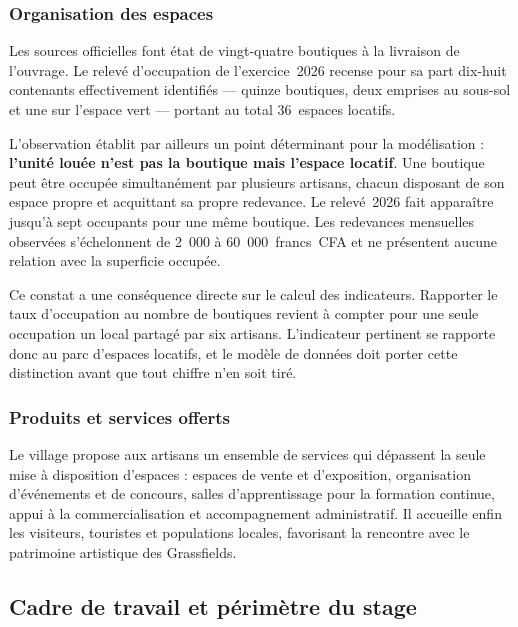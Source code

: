 \subsubsection{Organisation des espaces}

Les sources officielles font état de vingt-quatre boutiques à la livraison de l'ouvrage. Le relevé d'occupation de l'exercice~2026 recense pour sa part dix-huit contenants effectivement identifiés --- quinze boutiques, deux emprises au sous-sol et une sur l'espace vert --- portant au total 36~espaces locatifs.

L'observation établit par ailleurs un point déterminant pour la modélisation : \textbf{l'unité louée n'est pas la boutique mais l'espace locatif}. Une boutique peut être occupée simultanément par plusieurs artisans, chacun disposant de son espace propre et acquittant sa propre redevance. Le relevé~2026 fait apparaître jusqu'à sept occupants pour une même boutique. Les redevances mensuelles observées s'échelonnent de 2~000 à 60~000~francs~CFA et ne présentent aucune relation avec la superficie occupée.

Ce constat a une conséquence directe sur le calcul des indicateurs. Rapporter le taux d'occupation au nombre de boutiques revient à compter pour une seule occupation un local partagé par six artisans. L'indicateur pertinent se rapporte donc au parc d'espaces locatifs, et le modèle de données doit porter cette distinction avant que tout chiffre n'en soit tiré.

\subsubsection{Produits et services offerts}

Le village propose aux artisans un ensemble de services qui dépassent la seule mise à disposition d'espaces : espaces de vente et d'exposition, organisation d'événements et de concours, salles d'apprentissage pour la formation continue, appui à la commercialisation et accompagnement administratif. Il accueille enfin les visiteurs, touristes et populations locales, favorisant la rencontre avec le patrimoine artistique des Grassfields.


\subsection{Cadre de travail et périmètre du stage}

